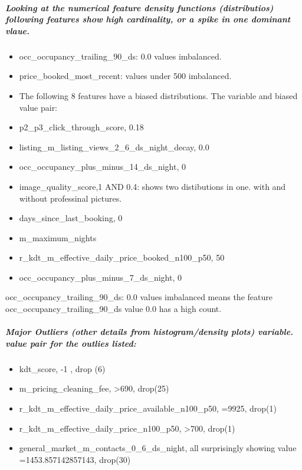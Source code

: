 \documentclass[11pt]{article}
\providecommand{\tightlist}{%
      \setlength{\itemsep}{0pt}\setlength{\parskip}{0pt}}
\begin{document}
\subparagraph{Looking at the numerical feature density functions
(distributios) following features show high cardinality, or a spike in
one dominant
vlaue.}\label{looking-at-the-numerical-feature-density-functions-distributios-following-features-show-high-cardinality-or-a-spike-in-one-dominant-vlaue.}

\begin{itemize}
\tightlist
\item
  occ\_occupancy\_trailing\_90\_ds: 0.0 values imbalanced.
\item
  price\_booked\_most\_recent: values under 500 imbalanced.
\item
  The following 8 features have a biased distributions. The variable and
  biased value pair:
\item
  p2\_p3\_click\_through\_score, 0.18
\item
  listing\_m\_listing\_views\_2\_6\_ds\_night\_decay, 0.0
\item
  occ\_occupancy\_plus\_minus\_14\_ds\_night, 0
\item
  image\_quality\_score,1 AND 0.4: shows two distibutions in one. with
  and without professinal pictures.
\item
  days\_since\_last\_booking, 0
\item
  m\_maximum\_nights
\item
  r\_kdt\_m\_effective\_daily\_price\_booked\_n100\_p50, 50
\item
  occ\_occupancy\_plus\_minus\_7\_ds\_night, 0
\end{itemize}

occ\_occupancy\_trailing\_90\_ds: 0.0 values imbalanced means the
feature occ\_occupancy\_trailing\_90\_ds value 0.0 has a high count.

\subparagraph{Major Outliers (other details from histogram/density
plots) variable. value pair for the outlies
listed:}\label{major-outliers-other-details-from-histogramdensity-plots-variable.-value-pair-for-the-outlies-listed}

\begin{itemize}
\tightlist
\item
  kdt\_score, -1 , drop (6)
\item
  m\_pricing\_cleaning\_fee, \textgreater{}690, drop(25)
\item
  r\_kdt\_m\_effective\_daily\_price\_available\_n100\_p50, =9925,
  drop(1)
\item
  r\_kdt\_m\_effective\_daily\_price\_n100\_p50, \textgreater{}700,
  drop(1)
\item
  general\_market\_m\_contacts\_0\_6\_ds\_night, all surprisingly
  showing value =1453.857142857143, drop(30)
\end{itemize}
\end{document}
